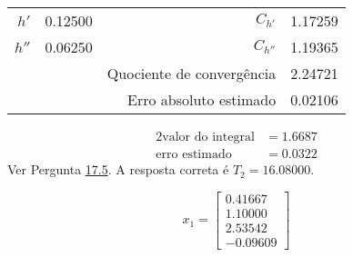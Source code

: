 {\begin{center}
\begin{tabular}{ r | c || r | c}
	$h' $ & 0.12500 & $C_{h'} $ & 1.17259 \\
	$h''$ & 0.06250 & $C_{h''}$ & 1.19365 \\
	      &         & Quociente de convergência & 2.24721 \\
	      &         & Erro absoluto estimado & 0.02106
\end{tabular} \end{center}
%
\begin{alignat*}{2}
	\text{valor do integral} &= 1.6687\\
	\text{erro estimado}     &= 0.0322
\end{alignat*}
Ver Pergunta \hyperref[ssec:17_5]{17.5}.
%
A resposta correta é $T_2=16.08000$.

%
\begin{equation*}
	x_1 = \begin{bmatrix}
		0.41667\\
		1.10000\\
		2.53542\\
		-0.09609
	\end{bmatrix}
\end{equation*}
}